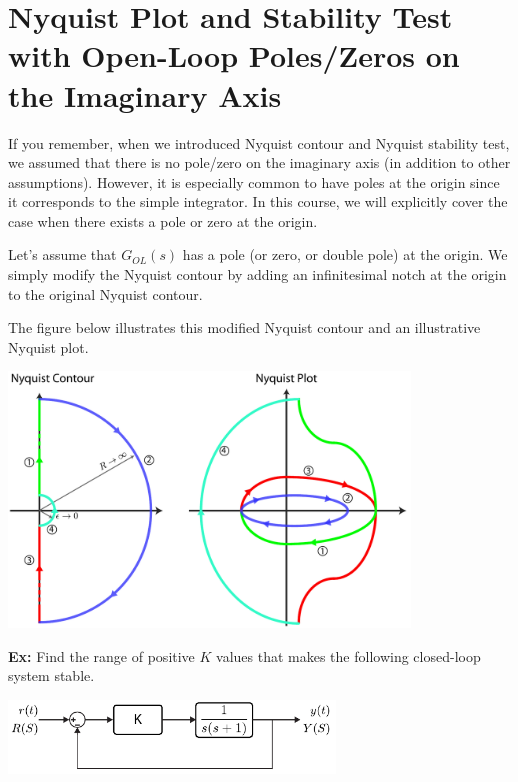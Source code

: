 \documentclass{article}
\begin{document}
\section*{Nyquist Plot and Stability Test with  Open-Loop Poles/Zeros on the Imaginary Axis}

If you remember, when we introduced Nyquist contour and Nyquist stability test, we assumed that there is no pole/zero on the imaginary axis (in addition to other assumptions). However, it is especially common to have poles at the origin since it corresponds to the simple integrator. In this course, we will explicitly cover the case when there exists a pole or zero at the origin.

Let's assume that $G_{OL}(s)$ has a pole (or zero, or double pole)
at the origin. We simply modify the Nyquist contour by adding an
infinitesimal notch at the origin to the original Nyquist contour. 

The figure below illustrates this modified Nyquist contour and 
an illustrative Nyquist plot. 

\vspace{12 pt}

  \begin{minipage}[h]{1\linewidth}
    \begin{center}
      \includegraphics[width=0.8\textwidth]{originnyq}
    \end{center}
  \end{minipage}

\vspace{6 pt}

\newpage

\textbf{Ex:} Find the range of positive $K$ values that makes the
following closed-loop system stable. 

\vspace{12 pt}

  \begin{minipage}[h]{1\linewidth}
    \begin{center}
      \includegraphics[width=0.65\textwidth]{ex5block}
    \end{center}
  \end{minipage}
\end{document}
